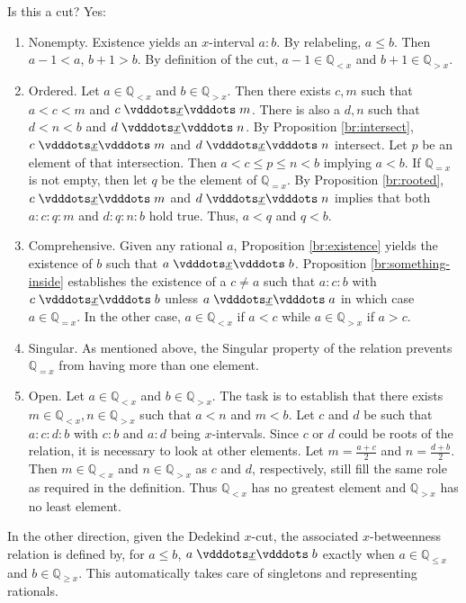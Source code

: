 \documentclass[12pt]{article}
\newcommand{\qcut}[2][x]{\ensuremath{\mathbb{Q}_{#2 #1}}}
\newcommand{\qlt}[1][x]{\qcut[#1]{<}}
\newcommand{\qeq}[1][x]{\qcut[#1]{=}}
\newcommand{\qgt}[1][x]{\qcut[#1]{>}}
\newcommand{\qgeq}[1][x]{\qcut[#1]{\geq}}
\newcommand{\qleq}[1][x]{\qcut[#1]{\leq}}
\begin{document}
Is this a cut? Yes: 
\begin{enumerate}
    \item Nonempty. Existence yields an $x$-interval $a:b$. By relabeling, $a \leq b$. Then $a-1< a$, $b+1 > b$. By definition of the cut, $a-1 \in \qlt$ and $b+1 \in \qgt$.
    \item Ordered. Let $a \in \qlt$ and $b \in \qgt$.  Then there exists $c, m$ such that $a < c < m$ and $c \xrel m$. There is also a $d, n$ such that $d < n< b$  and $d \xrel n$. By Proposition \ref{br:intersect}, $c \xrel m$ and $d \xrel n$ intersect. Let $p$ be an element of that intersection. Then $a < c \leq p \leq n < b$ implying $a < b$.  If $\qeq$ is not empty, then let $q$ be the element of $\qeq$. By Proposition \ref{br:rooted}, $c \xrel m$ and $d \xrel n$ implies that both $a:c:q:m$ and $d:q:n:b$ hold true. Thus, $a < q$ and $q < b$.  
    \item Comprehensive. Given any rational $a$, Proposition \ref{br:existence} yields the existence of $b$ such that $a \xrel b$. Proposition \ref{br:something-inside} establishes the existence of a $c \neq a$ such that $a:c:b$ with $c \xrel b$ unless $a \xrel a$ in which case $a \in \qeq$. In the other case, $a \in \qlt$ if $a < c$ while $a  \in \qgt$ if $a > c$. 
    \item Singular. As mentioned above, the Singular property of the relation prevents $\qeq$ from having more than one element. 
    \item Open. Let $a\in \qlt$ and $b \in \qgt$. The task is to establish that there exists $m \in \qlt, n \in \qgt$ such that $a < n$ and $m < b$. Let $c$ and $d$ be such that $a:c:d:b$ with $c:b$ and $a:d$ being $x$-intervals. Since $c$ or $d$ could be roots of the relation, it is necessary to look at other elements. Let $m = \frac{a+c}{2}$ and $n = \frac{d+b}{2}$. Then $m \in \qlt$ and $n \in \qgt$ as $c$ and $d$, respectively, still fill the same role as required in the definition. Thus $\qlt$ has no greatest element and $\qgt$ has no least element. 
\end{enumerate}

In the other direction, given the Dedekind $x$-cut, the associated $x$-betweenness relation is defined by, for $a \leq b$, $a \xrel b$ exactly when $a \in \qleq$ and $b \in \qgeq$. This automatically takes care of singletons and representing rationals. 
\end{document}
